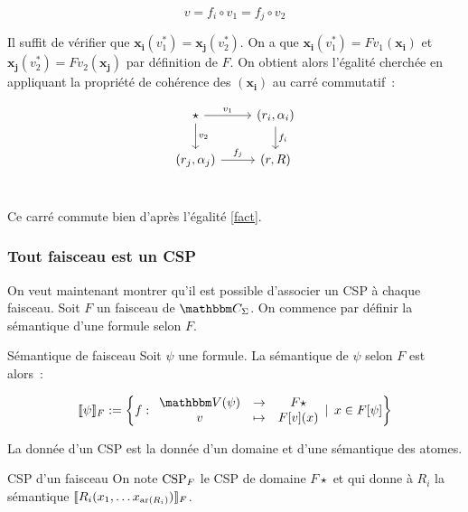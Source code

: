 \begin{pv}
    \begin{equation}\label{fact} v = f_i\circ v_1 = f_j\circ v_2 \end{equation}
    
    Il suffit de vérifier que $\mathbf{x_i}(v_1^*) = \mathbf{x_j}(v_2^*)$.
    On a que $\mathbf{x_i}(v_1^*) = Fv_1(\mathbf{x_i})$ et
    $\mathbf{x_j}(v_2^*) = Fv_2(\mathbf{x_j})$ par définition de $F$. On obtient alors
    l'égalité cherchée en appliquant la propriété de cohérence des $(\mathbf{x_i})$
    au carré commutatif~:

    \[\begin{tikzcd}
        \star \arrow[r, "v_1"] \arrow[d, "v_2"] & (r_i,\alpha_i) \arrow[d, "f_i"] \\
        (r_j,\alpha_j) \arrow[r, "f_j"] & (r,R) \\
    \end{tikzcd}\]

    Ce carré commute bien d'après l'égalité \ref{fact}.
\end{pv}

\subsubsection{Tout faisceau est un CSP}

On veut maintenant montrer qu'il est possible d'associer un CSP à chaque faisceau. Soit
$F$ un faisceau de $\C_\Sigma$. On commence par définir la sémantique d'une formule
selon $F$.

\begin{defi}{Sémantique de faisceau}\label{shSem}
    Soit $\psi$ une formule. La sémantique de $\psi$ selon $F$ est alors~:

    \[ \sem{\psi}_F := \left\{ f:\begin{array}{ccc}
            \V(\psi) & \rightarrow & F\star \\
            v        & \mapsto     & F[v](x) \\
    \end{array}\Large|~x\in F[\psi] \right\}\]
\end{defi}

La donnée d'un CSP est la donnée d'un domaine et d'une sémantique des atomes.

\begin{defi}{CSP d'un faisceau}
    On note $\text{CSP}_F$ le CSP de domaine $F\star$ et qui donne à
    $R_i$ la sémantique $\llbracket {R_i(x_1, \dots x_{\text{ar}(R_i)})} \rrbracket_F$.
\end{defi}

